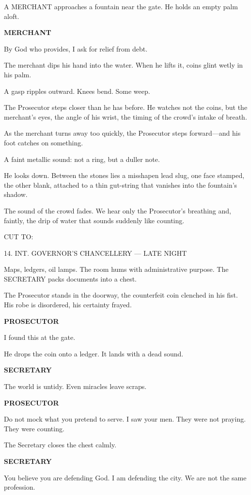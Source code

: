 \documentclass[12pt]{article}
\newlength{\charindent}
\newlength{\dialogueindent}
\newlength{\dialoguewidth}
\newlength{\transitionindent}
\newcommand{\slug}[1]{\vspace{1.25em}\textsc{#1}\vspace{0.5em}}
\newcommand{\action}[1]{#1}
\newcommand{\character}[1]{%
  \par\vspace{0.75em}%
  \hspace*{\charindent}\textbf{#1}%
}
\newcommand{\dialogue}[1]{%
  \par\nobreak
  \hspace*{\dialogueindent}%
  \begin{minipage}[t]{\dialoguewidth}
  #1
  \end{minipage}
}
\newcommand{\transition}[1]{%
  \par\vspace{1em}%
  \hspace*{\transitionindent}\textsc{#1}%
}
\begin{document}
\action{A MERCHANT approaches a fountain near the gate. He holds an empty palm aloft.}

\character{MERCHANT}
\dialogue{By God who provides, I ask for relief from debt.}

\action{The merchant dips his hand into the water. When he lifts it, coins glint wetly in his palm.}

\action{A gasp ripples outward. Knees bend. Some weep.}

\action{The Prosecutor steps closer than he has before. He watches not the coins, but the merchant’s eyes, the angle of his wrist, the timing of the crowd’s intake of breath.}

\action{As the merchant turns away too quickly, the Prosecutor steps forward—and his foot catches on something.}

\action{A faint metallic sound: not a ring, but a duller note.}

\action{He looks down. Between the stones lies a misshapen lead slug, one face stamped, the other blank, attached to a thin gut-string that vanishes into the fountain’s shadow.}

\action{The sound of the crowd fades. We hear only the Prosecutor’s breathing and, faintly, the drip of water that sounds suddenly like counting.}

\transition{CUT TO:}

\slug{14. INT. GOVERNOR’S CHANCELLERY --- LATE NIGHT}

\action{Maps, ledgers, oil lamps. The room hums with administrative purpose. The SECRETARY packs documents into a chest.}

\action{The Prosecutor stands in the doorway, the counterfeit coin clenched in his fist. His robe is disordered, his certainty frayed.}

\character{PROSECUTOR}
\dialogue{I found this at the gate.}

\action{He drops the coin onto a ledger. It lands with a dead sound.}

\character{SECRETARY}
\dialogue{The world is untidy. Even miracles leave scraps.}

\character{PROSECUTOR}
\dialogue{Do not mock what you pretend to serve. I saw your men. They were not praying. They were counting.}

\action{The Secretary closes the chest calmly.}

\character{SECRETARY}
\dialogue{You believe you are defending God. I am defending the city. We are not the same profession.}
\end{document}
